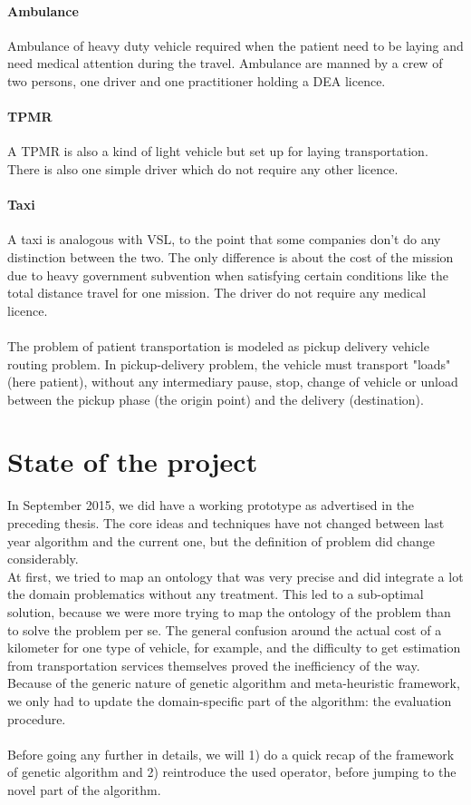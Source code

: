 \documentclass[12pt]{memoir}
\begin{document}
\paragraph{Ambulance} %
\label{par:Ambulance}
Ambulance of heavy duty vehicle required when the patient need to be laying and need
medical attention during the travel. Ambulance are manned by a crew of two persons,
one driver and one practitioner holding a DEA licence.

  \paragraph{TPMR} %
\label{par:TPMR}
A TPMR is also a kind of light vehicle but set up for laying transportation. There is
also one simple driver which do not require any other licence. 

  \paragraph{Taxi} %
\label{par:Taxi}
A taxi is analogous with VSL, to the point that some companies don't do any
distinction between the two. The only difference is about the cost of the mission
due to heavy government subvention when satisfying certain conditions like the total
distance travel for one mission. The driver do not require any medical licence.\\
\\
The problem of patient transportation is modeled as pickup delivery vehicle routing
problem. In pickup-delivery problem, the vehicle must transport "loads" (here
patient), without any intermediary pause, stop, change of vehicle or unload
between the pickup phase (the origin point) and the delivery (destination).

\section{State of the project}
In September 2015, we did have a working prototype as advertised in the preceding
thesis. The core ideas and techniques have not changed between last year algorithm
and the current one, but the definition of problem did change considerably. \\
At first, we tried to map an ontology that was very precise and did integrate a lot
the domain problematics without any treatment. This led to a sub-optimal solution,
because we were more trying to map the ontology of the problem than to solve the
problem per se. The general confusion around the actual cost of a kilometer for
one type of vehicle, for example, and the difficulty to get estimation from transportation services
themselves proved the inefficiency of the way.\\
Because of the generic nature of genetic algorithm and meta-heuristic framework, we only
had to update the domain-specific part of the algorithm: the evaluation procedure.\\
\\
Before going any further in details, we will 1) do a quick recap of the framework
of genetic algorithm and 2) reintroduce the used operator, before jumping to the
novel part of the algorithm.
\end{document}
